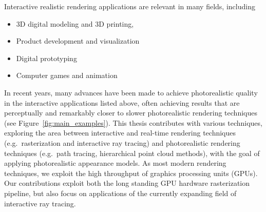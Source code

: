 Interactive realistic rendering applications are relevant in many fields, including
\begin{itemize}
\item 3D digital modeling and 3D printing,
\item Product development and visualization
\item Digital prototyping
\item Computer games and animation
\end{itemize}
In recent years, many advances have been made to achieve photorealistic quality in the interactive applications listed above, often achieving results that are perceptually and remarkably closer to slower photorealistic rendering techniques (see Figure~\ref{fig:main_examples}). This thesis contributes with various techniques, exploring the area between interactive and real-time rendering techniques (e.g.\ rasterization and interactive ray tracing) and photorealistic rendering techniques (e.g.\ path tracing, hierarchical point cloud methods), with the goal of applying photorealistic appearance models. As most modern rendering techniques, we exploit the high throughput of graphics processing units (GPUs). Our contributions exploit both the long standing GPU hardware rasterization pipeline, but also focus on applications of the currently expanding field of interactive ray tracing. 
%
